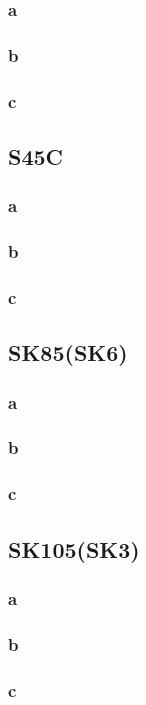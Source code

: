 \documentclass[10pt,a4j]{jsarticle}
\begin{document}
      \subsubsection{a}
    \subsubsection{b}
    \subsubsection{c}
  \subsection{S45C}
      \subsubsection{a}
    \subsubsection{b}
    \subsubsection{c}
  \subsection{SK85(SK6)}
      \subsubsection{a}
    \subsubsection{b}
    \subsubsection{c}
  \subsection{SK105(SK3)}
    \subsubsection{a}
    \subsubsection{b}
    \subsubsection{c}
\end{document}
